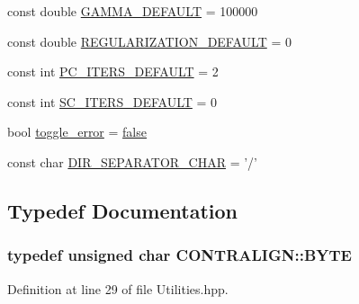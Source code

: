 \begin{DoxyCompactItemize}
\item 
const double \hyperlink{namespace_c_o_n_t_r_a_l_i_g_n_acc27a8d5de00a0e2b28341a554b1671e}{G\+A\+M\+M\+A\+\_\+\+D\+E\+F\+A\+U\+L\+T} = 100000
\item 
const double \hyperlink{namespace_c_o_n_t_r_a_l_i_g_n_ab8d1796ab4c3172fefb62e6551fc0e6a}{R\+E\+G\+U\+L\+A\+R\+I\+Z\+A\+T\+I\+O\+N\+\_\+\+D\+E\+F\+A\+U\+L\+T} = 0
\item 
const int \hyperlink{namespace_c_o_n_t_r_a_l_i_g_n_a7eae27d13bfe8d19d465e4e02325b7ca}{P\+C\+\_\+\+I\+T\+E\+R\+S\+\_\+\+D\+E\+F\+A\+U\+L\+T} = 2
\item 
const int \hyperlink{namespace_c_o_n_t_r_a_l_i_g_n_a5d28e8f24c1100580fce7418871aab48}{S\+C\+\_\+\+I\+T\+E\+R\+S\+\_\+\+D\+E\+F\+A\+U\+L\+T} = 0
\item 
bool \hyperlink{namespace_c_o_n_t_r_a_l_i_g_n_ab3c518611777e6b169ba6c8f0fadfc9d}{toggle\+\_\+error} = \hyperlink{naview_8c_a65e9886d74aaee76545e83dd09011727}{false}
\item 
const char \hyperlink{namespace_c_o_n_t_r_a_l_i_g_n_a10799300da481510c609583326c3bcaa}{D\+I\+R\+\_\+\+S\+E\+P\+A\+R\+A\+T\+O\+R\+\_\+\+C\+H\+A\+R} = '/'
\end{DoxyCompactItemize}


\subsection{Typedef Documentation}
\hypertarget{namespace_c_o_n_t_r_a_l_i_g_n_a493b7d65e8378d6b823fd6332f1caa79}{
\subsubsection[{B\+Y\+T\+E}]{\setlength{\rightskip}{0pt plus 5cm}typedef unsigned char {\bf C\+O\+N\+T\+R\+A\+L\+I\+G\+N\+::\+B\+Y\+T\+E}}}\label{namespace_c_o_n_t_r_a_l_i_g_n_a493b7d65e8378d6b823fd6332f1caa79}


Definition at line 29 of file Utilities.\+hpp.



